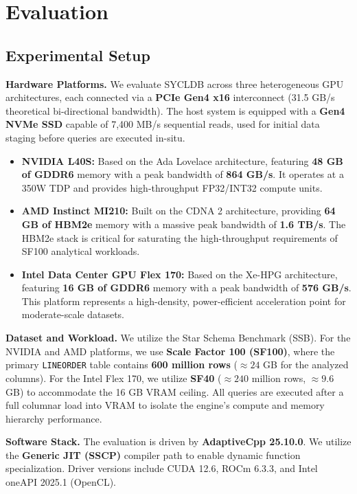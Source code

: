 \section{Evaluation}

\subsection{Experimental Setup}

\textbf{Hardware Platforms.} We evaluate SYCLDB across three heterogeneous GPU architectures, each connected via a \textbf{PCIe Gen4 x16} interconnect (31.5 GB/s theoretical bi-directional bandwidth). The host system is equipped with a \textbf{Gen4 NVMe SSD} capable of 7,400 MB/s sequential reads, used for initial data staging before queries are executed in-situ.

\begin{itemize}
    \item \textbf{NVIDIA L40S:} Based on the Ada Lovelace architecture, featuring \textbf{48 GB of GDDR6} memory with a peak bandwidth of \textbf{864 GB/s}. It operates at a 350W TDP and provides high-throughput FP32/INT32 compute units.
    \item \textbf{AMD Instinct MI210:} Built on the CDNA 2 architecture, providing \textbf{64 GB of HBM2e} memory with a massive peak bandwidth of \textbf{1.6 TB/s}. The HBM2e stack is critical for saturating the high-throughput requirements of SF100 analytical workloads.
    \item \textbf{Intel Data Center GPU Flex 170:} Based on the Xe-HPG architecture, featuring \textbf{16 GB of GDDR6} memory with a peak bandwidth of \textbf{576 GB/s}. This platform represents a high-density, power-efficient acceleration point for moderate-scale datasets.
\end{itemize}

\textbf{Dataset and Workload.} We utilize the Star Schema Benchmark (SSB). For the NVIDIA and AMD platforms, we use \textbf{Scale Factor 100 (SF100)}, where the primary \texttt{LINEORDER} table contains \textbf{600 million rows} ($\approx 24$ GB for the analyzed columns). For the Intel Flex 170, we utilize \textbf{SF40} ($\approx 240$ million rows, $\approx 9.6$ GB) to accommodate the 16 GB VRAM ceiling. All queries are executed after a full columnar load into VRAM to isolate the engine's compute and memory hierarchy performance.

\textbf{Software Stack.} The evaluation is driven by \textbf{AdaptiveCpp 25.10.0}. We utilize the \textbf{Generic JIT (SSCP)} compiler path to enable dynamic function specialization. Driver versions include CUDA 12.6, ROCm 6.3.3, and Intel oneAPI 2025.1 (OpenCL).

